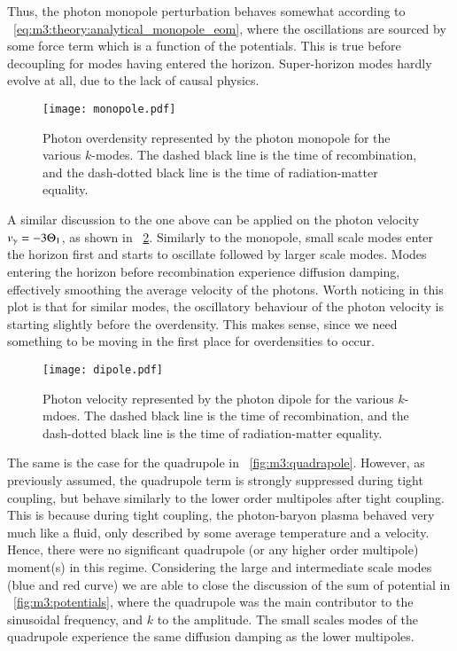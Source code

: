     Thus, the photon monopole perturbation behaves somewhat according to ~\cref{eq:m3:theory:analytical_monopole_eom}, where the oscillations are sourced by some force term which is a function of the potentials. This is true before decoupling for modes having entered the horizon. Super-horizon modes hardly evolve at all, due to the lack of causal physics. 
    \begin{figure}
        \texttt{[image: monopole.pdf]}
        \caption{Photon overdensity represented by the photon monopole for the various $k$-modes. The dashed black line is the time of recombination, and the dash-dotted black line is the time of radiation-matter equality.}
        \label{fig:m3:monopole}
    \end{figure}

    A similar discussion to the one above can be applied on the photon velocity $v_\gamma = -3\Theta_1$, as shown in ~\cref{fig:m3:dipole}. Similarly to the monopole, small scale modes enter the horizon first and starts to oscillate followed by larger scale modes. Modes entering the horizon before recombination experience diffusion damping, effectively smoothing the average velocity of the photons. Worth noticing in this plot is that for similar modes, the oscillatory behaviour of the photon velocity is starting slightly before the overdensity. This makes sense, since we need something to be moving in the first place for overdensities to occur. 

    \begin{figure}
        \texttt{[image: dipole.pdf]}
        \caption{Photon velocity represented by the photon dipole for the various $k$-mdoes. The dashed black line is the time of recombination, and the dash-dotted black line is the time of radiation-matter equality.}
        \label{fig:m3:dipole}
    \end{figure}

    The same is the case for the quadrupole in ~\cref{fig:m3:quadrapole}. However, as previously assumed, the quadrupole term is strongly suppressed during tight coupling, but behave similarly to the lower order multipoles after tight coupling. This is because during tight coupling, the photon-baryon plasma behaved very much like a fluid, only described by some average temperature and a velocity. Hence, there were no significant quadrupole (or any higher order multipole) moment(s) in this regime. Considering the large and intermediate scale modes (blue and red curve) we are able to close the discussion of the sum of potential in ~\cref{fig:m3:potentials}, where the quadrupole was the main contributor to the sinusoidal frequency, and $k$ to the amplitude. The small scales modes of the quadrupole experience the same diffusion damping as the lower multipoles. 

